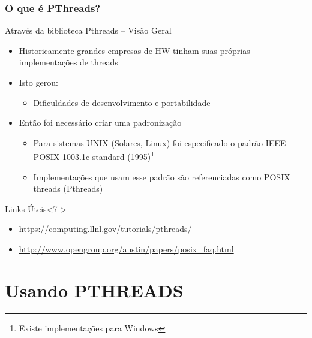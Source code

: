 \documentclass[10pt, xcolor=x11names]{beamer}
\begin{document}
\begin{frame} \frametitle{O que é PThreads?}
	\begin{block}{Através da biblioteca Pthreads -- Visão Geral}
		\begin{itemize}[<+->]
			\item Historicamente grandes empresas de HW tinham suas próprias implementações de threads
			\item Isto gerou:
				\begin{itemize}
					\item Dificuldades de desenvolvimento e portabilidade
				\end{itemize}
			\item Então foi necessário criar uma padronização
				\begin{itemize}
					\item Para sistemas UNIX (Solares, Linux) foi especificado o padrão IEEE POSIX 1003.1c standard (1995)\footnote{Existe implementações para Windows}
					\item Implementações que usam esse padrão são referenciadas como POSIX threads (Pthreads)
				\end{itemize}
		\end{itemize}
	\end{block}

	\begin{block}{Links Úteis}<7->
		\begin{itemize}
			\item \url{https://computing.llnl.gov/tutorials/pthreads/}
			\item \url{http://www.opengroup.org/austin/papers/posix_faq.html}
			
		\end{itemize}
	\end{block}
\end{frame}

\section{Usando PTHREADS} 
\end{document}
